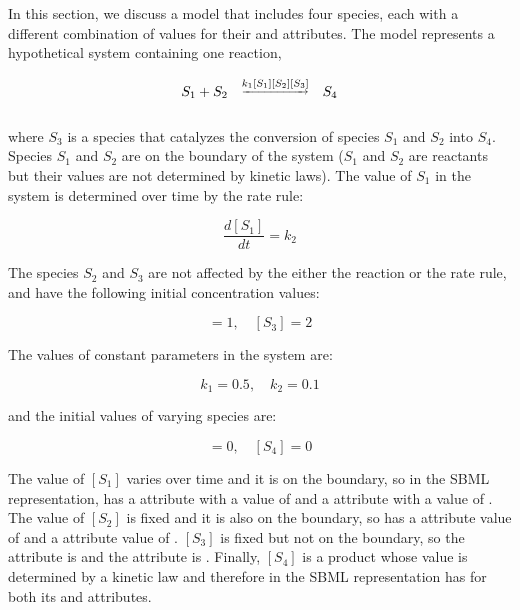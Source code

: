 In this section, we discuss a model that includes four species,
each with a different combination of values for their
 and  attributes.  The
model represents a hypothetical system containing one reaction,
\begin{linenomath}
\begin{equation*}
  \begin{array}{@{}ccc@{}}
    S_1 + S_2 & \overset{\underrightarrow{k_1 [S_1] [S_2] [S_3]}}{} & S_4 \\ \\[-4pt]
  \end{array}
\end{equation*}
\end{linenomath}
where $S_3$ is a species that catalyzes the conversion of species
$S_1$ and $S_2$ into $S_4$.  Species $S_1$ and $S_2$ are on the
boundary of the system (\ie $S_1$ and $S_2$ are reactants but
their values are not determined by kinetic laws).  The value of
$S_1$ in the system is determined over time by the rate rule:
\begin{linenomath}
\begin{equation*}
  \dfrac{d [S_1]}{d t} = k_2
\end{equation*}
\end{linenomath}
The species $S_2$ and $S_3$ are not affected by the either the
reaction or the rate rule, and have the following initial
concentration values:
\begin{linenomath}
\begin{equation*}
    [S_2] = 1, \quad [S_3] = 2
  \end{equation*}
\end{linenomath}
The values of constant parameters in the system are:
\begin{linenomath}
\begin{equation*}
    k_1 = 0.5, \quad k_2 = 0.1
  \end{equation*}
\end{linenomath}
and the initial values of varying species are:
\begin{linenomath}
\begin{equation*}
    [S_1] = 0, \quad [S_4] = 0
\end{equation*}
\end{linenomath}

The value of $[S_1]$ varies over time and it is on the boundary,
so in the SBML representation,  has a 
attribute with a value of  and a
 attribute with a value of .
The value of $[S_2]$ is fixed and it is also on the boundary, so
 has a  attribute value of 
and a  attribute value of .
$[S_3]$ is fixed but not on the boundary, so the 
attribute is  and the 
attribute is .  Finally, $[S_4]$ is a product whose
value is determined by a kinetic law and therefore in the SBML
representation has  for both its
 and  attributes.

